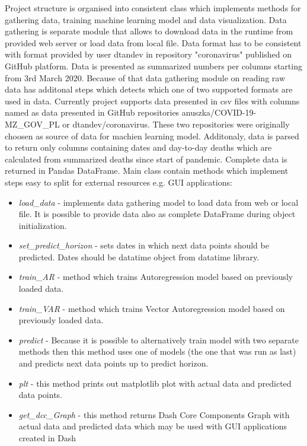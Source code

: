 \documentclass[conference]{IEEEtran}
\begin{document}
Project structure is organised into consistent class which implements methods for gathering data, training machine learning model and data visualization.
\newline
\newline
Data gathering is separate module that allows to download data in the runtime from provided web server or load data from local file.
Data format has to be consistent with format provided by user dtandev in repository "coronavirus" published on GitHub platform.
Data is presented as summarized numbers per columns starting from 3rd March 2020.
Because of that data gathering module on reading raw data has additonal steps which
detects which one of two supported formats are used in data.
Currently project supports data presented in csv files with columns named as data presented in GitHub repositories anuszka/COVID-19-MZ\_GOV\_PL or dtandev/coronavirus.
These two repositories were originally choosen as source of data for machien learning model.
Additonaly, data is parsed to return only columns containing dates and day-to-day deaths which are calculated from summarized deaths since start of pandemic.
Complete data is returned in Pandas DataFrame.
\newline
\newline
Main class contain methods which implement steps easy to split for external resources e.g. GUI applications:
\begin{itemize}
\item \textit{load\_data} - implements data gathering model to load data from web or local file. It is possible to provide data also as complete DataFrame during object initialization.
\item \textit{set\_predict\_horizon} - sets dates in which next data points should be predicted. Dates should be datatime object from datatime library.
\item \textit{train\_AR} - method which trains Autoregression model based on previously loaded data.
\item \textit{train\_VAR} - method which trains Vector Autoregression model based on previously loaded data.
\item \textit{predict} - Because it is possible to alternatively train model with two separate methods then this method uses one of models (the one that was run as last) and predicts next data points up to predict horizon.
\item \textit{plt} - this method prints out matplotlib plot with actual data and predicted data points.
\item \textit{get\_dcc\_Graph} - this method returns Dash Core Components Graph with actual data and predicted data which may be used with GUI applications created in Dash
\end{itemize}
\end{document}
